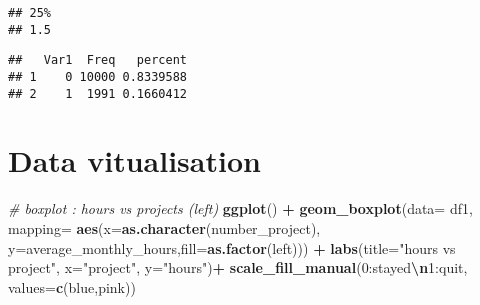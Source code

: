 \documentclass[
]{article}
\newenvironment{Shaded}{\begin{snugshade}}{\end{snugshade}}
\newcommand{\AttributeTok}[1]{\textcolor[rgb]{0.13,0.29,0.53}{#1}}
\newcommand{\CommentTok}[1]{\textcolor[rgb]{0.56,0.35,0.01}{\textit{#1}}}
\newcommand{\FunctionTok}[1]{\textcolor[rgb]{0.13,0.29,0.53}{\textbf{#1}}}
\newcommand{\NormalTok}[1]{#1}
\newcommand{\OtherTok}[1]{\textcolor[rgb]{0.56,0.35,0.01}{#1}}
\newcommand{\SpecialCharTok}[1]{\textcolor[rgb]{0.81,0.36,0.00}{\textbf{#1}}}
\newcommand{\StringTok}[1]{\textcolor[rgb]{0.31,0.60,0.02}{#1}}
\begin{document}
\begin{verbatim}
## 25% 
## 1.5
\end{verbatim}

\begin{Shaded}
\end{Shaded}

\begin{verbatim}
##   Var1  Freq   percent
## 1    0 10000 0.8339588
## 2    1  1991 0.1660412
\end{verbatim}

\section{Data vitualisation}\label{data-vitualisation}

\begin{Shaded}
\begin{Highlighting}[]
\CommentTok{\# boxplot : hours vs projects (left)}
\FunctionTok{ggplot}\NormalTok{() }\SpecialCharTok{+} \FunctionTok{geom\_boxplot}\NormalTok{(}\AttributeTok{data=}\NormalTok{ df1, }\AttributeTok{mapping=} \FunctionTok{aes}\NormalTok{(}\AttributeTok{x=}\FunctionTok{as.character}\NormalTok{(number\_project), }\AttributeTok{y=}\NormalTok{average\_monthly\_hours,}\AttributeTok{fill=}\FunctionTok{as.factor}\NormalTok{(left))) }\SpecialCharTok{+}
\FunctionTok{labs}\NormalTok{(}\AttributeTok{title=}\StringTok{"hours vs project"}\NormalTok{, }\AttributeTok{x=}\StringTok{"project"}\NormalTok{, }\AttributeTok{y=}\StringTok{"hours"}\NormalTok{)}\SpecialCharTok{+} \FunctionTok{scale\_fill\_manual}\NormalTok{(}\StringTok{\textquotesingle{}0:stayed}\SpecialCharTok{\textbackslash{}n}\StringTok{1:quit\textquotesingle{}}\NormalTok{, }\AttributeTok{values=}\FunctionTok{c}\NormalTok{(}\StringTok{\textquotesingle{}blue\textquotesingle{}}\NormalTok{,}\StringTok{\textquotesingle{}pink\textquotesingle{}}\NormalTok{))}
\end{Highlighting}
\end{Shaded}
\end{document}
